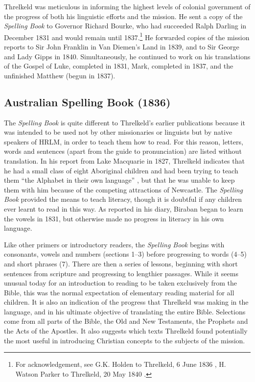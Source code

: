 {Threlkeld was meticulous in informing the highest levels of colonial government of the progress of both his linguistic efforts and the mission. He sent a copy of the \textit{Spelling Book} to Governor Richard Bourke, who had succeeded Ralph Darling in December 1831 and would remain until 1837.\footnote{For acknowledgement, see G.K. Holden to Threlkeld, 6 June 1836 , H. Watson Parker to Threlkeld, 20 May 1840 \citep[39--42]{threlkeld_threlkeld_1822-1862}.} He forwarded copies of the mission reports to Sir John Franklin in Van Diemen’s Land in 1839, and to Sir George and Lady Gipps in 1840. Simultaneously, he continued to work on his translations of the Gospel of Luke, completed in 1831, Mark, completed in 1837, and the unfinished Matthew (begun in 1837).

\subsection{Australian Spelling Book (1836)}

The \textit{Spelling Book} is quite different to Threlkeld’s earlier publications because it was intended to be used not by other missionaries or linguists but by native speakers of HRLM, in order to teach them how to read. For this reason, letters, words and sentences (apart from the guide to pronunciation) are listed without translation. In his report from Lake Macquarie in 1827, Threlkeld indicates that he had a small class of eight Aboriginal children and had been trying to teach them “the Alphabet in their own language” \citep[96]{gunson_australian_1974a}, but that he was unable to keep them with him because of the competing attractions of Newcastle. The \textit{Spelling Book} provided the means to teach literacy, though it is doubtful if any children ever learnt to read in this way. As \citet[126]{threlkeld_journal_1828-1846} reported in his diary, Biraban began to learn the vowels in 1831, but otherwise made no progress in literacy in his own language.

Like other primers or introductory readers, the \textit{Spelling Book} begins with consonants, vowels and numbers (sections 1--3) before progressing to words (4--5) and short phrases (7). There are then a series of lessons, beginning with short sentences from scripture and progressing to lengthier passages. While it seems unusual today for an introduction to reading to be taken exclusively from the Bible, this was the normal expectation of elementary reading material for all children. It is also an indication of the progress that Threlkeld was making in the language, and in his ultimate objective of translating the entire Bible. Selections come from all parts of the Bible, the Old and New Testaments, the Prophets and the Acts of the Apostles. It also suggests which texts Threlkeld found potentially the most useful in introducing Christian concepts to the subjects of the mission.

}
